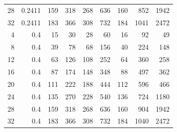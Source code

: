 \documentclass[11pt]{article}
\begin{document}
{\begin{longtable}{rrrrrrrrr}
28 & 0.2411 & 159 & 318 & 268 & 636 & 160 & 852 & 1942 \\
32 & 0.2411 & 183 & 366 & 308 & 732 & 184 & 1041 & 2472 \\
4 & 0.4 & 15 & 30 & 28 & 60 & 16 & 92 & 49 \\
8 & 0.4 & 39 & 78 & 68 & 156 & 40 & 224 & 148 \\
12 & 0.4 & 63 & 126 & 108 & 252 & 64 & 360 & 258 \\
16 & 0.4 & 87 & 174 & 148 & 348 & 88 & 497 & 362 \\
20 & 0.4 & 111 & 222 & 188 & 444 & 112 & 596 & 466 \\
24 & 0.4 & 135 & 270 & 228 & 540 & 136 & 724 & 1180 \\
28 & 0.4 & 159 & 318 & 268 & 636 & 160 & 904 & 1942 \\
32 & 0.4 & 183 & 366 & 308 & 732 & 184 & 1040 & 2472 \\
\end{longtable}
}
\end{document}
